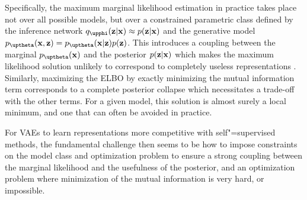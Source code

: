 Specifically, the maximum marginal likelihood estimation in practice takes place not over all possible models, but over a constrained parametric class defined by the inference network $q_\phib(\zb|\xb) \approx p(\zb|\xb)$ and the generative model $p_\thetab(\xb,\zb) = p_\thetab(\xb|\zb)p(\zb)$. 
This introduces a coupling between the marginal $p_{\thetab}(\xb)$ and the posterior $p({\mathbf{z}}|{\mathbf{x}})$ which makes the maximum likelihood solution unlikely to correspond to completely useless representations \parencite{huszar_is_2017}. 
Similarly, maximizing the ELBO %
by exactly minimizing the mutual information term corresponds to a complete posterior collapse which necessitates a trade-off with the other terms. For a given model, this solution is almost surely a local minimum, and one that can often be avoided in practice. 

For VAEs to learn representations more competitive with self"=supervised methods, the fundamental challenge then seems to be how to impose constraints on the model class and optimization problem to ensure a strong coupling between the marginal likelihood and the usefulness of the posterior, and an optimization problem where minimization of the mutual information is very hard, or impossible.




